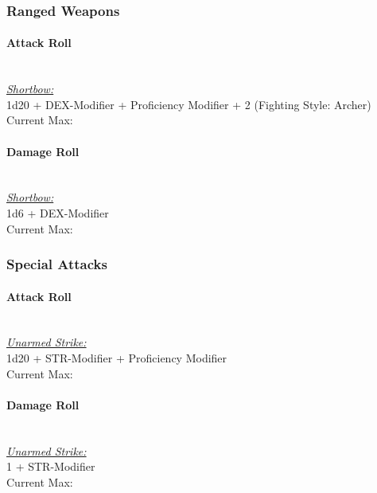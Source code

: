 {\subsubsection*{Ranged Weapons}
\paragraph*{Attack Roll}\hfill\\
\underline{\textit{Shortbow:}}\\
1d20 + DEX-Modifier + Proficiency Modifier + 2 (Fighting Style: Archer)\\
\indent Current Max: 
\paragraph*{Damage Roll}\hfill\\
\underline{\textit{Shortbow:}}\\
1d6 + DEX-Modifier\\
\indent Current Max: 
\subsubsection*{Special Attacks}
\paragraph*{Attack Roll}\hfill\\
\underline{\textit{Unarmed Strike:}}\\
1d20 + STR-Modifier + Proficiency Modifier\\
\indent Current Max: 
\paragraph*{Damage Roll}\hfill\\
\underline{\textit{Unarmed Strike:}}\\
1 + STR-Modifier\\
\indent Current Max: 
}